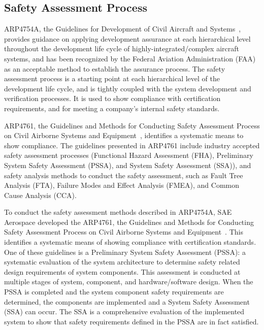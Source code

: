 \subsection{Safety Assessment Process}
\label{subsec:process}

ARP4754A, the Guidelines for Development of Civil Aircraft and Systems~\cite{SAE:ARP4754A}, provides guidance on applying development assurance at each hierarchical level throughout the development life cycle of highly-integrated/complex aircraft systems, and has been recognized by the Federal Aviation Administration (FAA) as an acceptable method to establish the assurance process. The safety assessment process is a starting point at each hierarchical level of the development life cycle, and is tightly coupled with the system development and verification processes. It is used to show compliance with certification requirements, and for meeting a company's internal safety standards. 

ARP4761, the Guidelines and Methods for Conducting Safety Assessment Process on Civil Airborne Systems and Equipment~\cite{SAE:ARP4761},  identifies a systematic means to show compliance. The guidelines presented in ARP4761 include industry accepted safety assessment processes (Functional Hazard Assessment (FHA), Preliminary System Safety Assessment (PSSA), and System Safety Assessment (SSA)), and safety analysis methods to conduct the safety assessment, 
such as Fault Tree Analysis (FTA), Failure Modes and Effect Analysis (FMEA), and Common Cause Analysis (CCA).


To conduct the safety assessment methods described in ARP4754A, SAE Aerospace developed the ARP4761, the Guidelines and Methods for Conducting Safety Assessment Process on Civil Airborne Systems and Equipment~\cite{SAE:ARP4761}. This identifies a systematic means of showing compliance with certification standards. One of these guidelines is a Preliminary System Safety Assessment (PSSA): a systematic evaluation of the system architecture to determine safety related design requirements of system components. This assessment is conducted at multiple stages of system, component, and hardware/software design. When the PSSA is completed and the system component safety requirements are determined, the components are implemented and a System Safety Assessment (SSA) can occur. The SSA is a comprehensive evaluation of the implemented system to show that safety requirements defined in the PSSA are in fact satisfied. 

